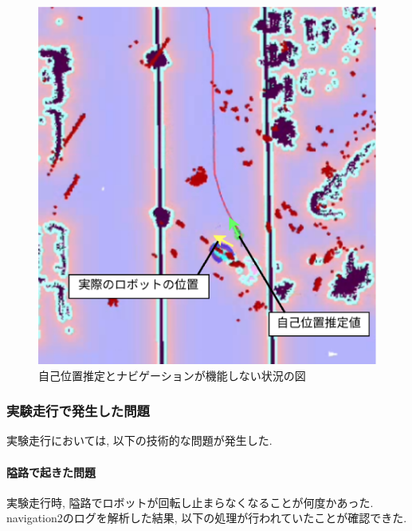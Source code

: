 \begin{figure}[h]
  \begin{center}
    \includegraphics[width=1.0\linewidth]{figs/kinako_result.eps}
    \caption{自己位置推定とナビゲーションが機能しない状況の図}
    \label{fig:kinako_result}
  \end{center}
\end{figure}



\subsubsection{実験走行で発生した問題}
実験走行においては, 以下の技術的な問題が発生した. 

\paragraph{隘路で起きた問題}
実験走行時, 隘路でロボットが回転し止まらなくなることが何度かあった. 
navigation2のログを解析した結果, 以下の処理が行われていたことが確認できた. 

